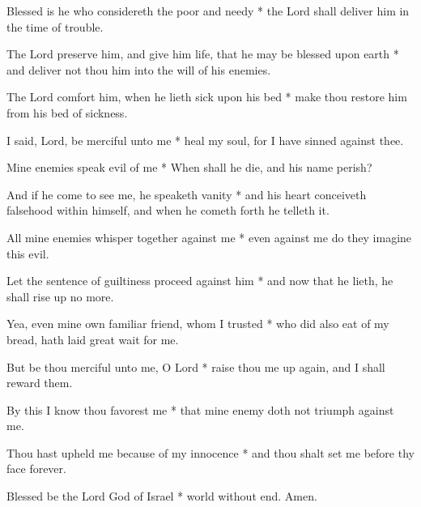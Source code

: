 Blessed is he who considereth the poor and needy * the Lord shall deliver him in the time of trouble.

The Lord preserve him, and give him life, that he may be blessed upon earth * and deliver not thou him into the will of his enemies.

The Lord comfort him, when he lieth sick upon his bed * make thou restore him from his bed of sickness.

I said, Lord, be merciful unto me * heal my soul, for I have sinned against thee.

Mine enemies speak evil of me * When shall he die, and his name perish?

And if he come to see me, he speaketh vanity * and his heart conceiveth falsehood within himself, and when he cometh forth he telleth it.

All mine enemies whisper together against me * even against me do they imagine this evil.

Let the sentence of guiltiness proceed against him * and now that he lieth, he shall rise up no more.

Yea, even mine own familiar friend, whom I trusted * who did also eat of my bread, hath laid great wait for me.

But be thou merciful unto me, O Lord * raise thou me up again, and I shall reward them.

By this I know thou favorest me * that mine enemy doth not triumph against me.

Thou hast upheld me because of my innocence * and thou shalt set me before thy face forever.

Blessed be the Lord God of Israel * world without end. Amen.
